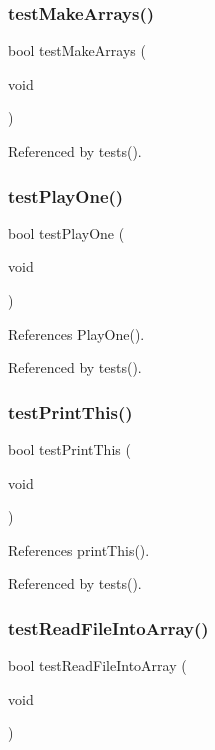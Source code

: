 \subsubsection{test\+Make\+Arrays()}
{\footnotesize\ttfamily bool test\+Make\+Arrays (\begin{DoxyParamCaption}\item[{void}]{ }\end{DoxyParamCaption})}



Referenced by tests().

\mbox{\label{tests_8h_aa4c8095a20d90a18d843ab63ecd02d00}} 
\subsubsection{test\+Play\+One()}
{\footnotesize\ttfamily bool test\+Play\+One (\begin{DoxyParamCaption}\item[{void}]{ }\end{DoxyParamCaption})}



References Play\+One().



Referenced by tests().

\mbox{\label{tests_8h_a0f6883340105133a6b03dfc5ebcf4b54}} 
\subsubsection{test\+Print\+This()}
{\footnotesize\ttfamily bool test\+Print\+This (\begin{DoxyParamCaption}\item[{void}]{ }\end{DoxyParamCaption})}



References print\+This().



Referenced by tests().

\mbox{\label{tests_8h_ae12ec7cb088bc82987c1d1e229d56a2d}} 
\subsubsection{test\+Read\+File\+Into\+Array()}
{\footnotesize\ttfamily bool test\+Read\+File\+Into\+Array (\begin{DoxyParamCaption}\item[{void}]{ }\end{DoxyParamCaption})}



